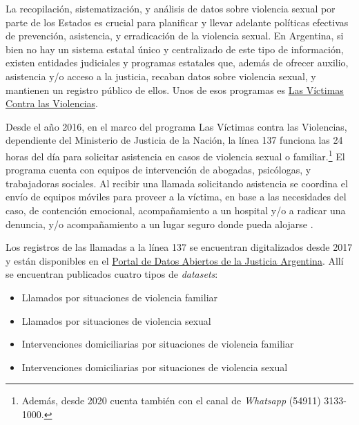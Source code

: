 \documentclass[10 pt]{article}
\begin{document}
La  recopilación, sistematización, y análisis de datos sobre violencia sexual por parte de los Estados es crucial para planificar y llevar adelante políticas efectivas de prevención, asistencia, y erradicación de la violencia sexual. En Argentina, si bien no hay un sistema estatal único y centralizado de este tipo de información, existen entidades judiciales y programas estatales que, además de ofrecer auxilio, asistencia y/o acceso a la justicia, recaban datos sobre violencia sexual, y mantienen un registro público de ellos. Unos de esos programas es \href{https://www.argentina.gob.ar/noticias/el-programa-nacional-las-victimas-contra-las-violencias-se-incorpora-la-direccion-de-acceso}{Las Víctimas Contra las Violencias}. 

Desde el año 2016, en el marco del programa Las Víctimas contra las Violencias, dependiente del Ministerio de Justicia de la Nación, la línea 137 funciona las 24 horas del día para solicitar asistencia en casos de violencia sexual o familiar.\footnote{Además, desde 2020 cuenta también con el canal de \textit{Whatsapp} (54911) 3133-1000.} El programa cuenta con equipos de intervención de abogadas, psicólogas, y trabajadoras sociales. Al recibir una llamada solicitando asistencia se coordina el envío de equipos móviles para proveer a la víctima, en base a las necesidades del caso, de contención emocional, acompañamiento a un hospital y/o a radicar una denuncia, y/o acompañamiento a un lugar seguro donde pueda alojarse \citep*{linea_137}.

Los registros de las llamadas a la línea 137 se encuentran digitalizados desde 2017 y están disponibles en el \href{http://datos.jus.gob.ar/}{Portal de Datos Abiertos de la Justicia Argentina}. Allí se encuentran publicados cuatro tipos de \textit{datasets}: 

\begin{itemize}
    \item Llamados por situaciones de violencia familiar
    \item Llamados por situaciones de violencia sexual
    \item Intervenciones domiciliarias por situaciones de violencia familiar
    \item Intervenciones domiciliarias por situaciones de violencia sexual
\end{itemize}
\end{document}
